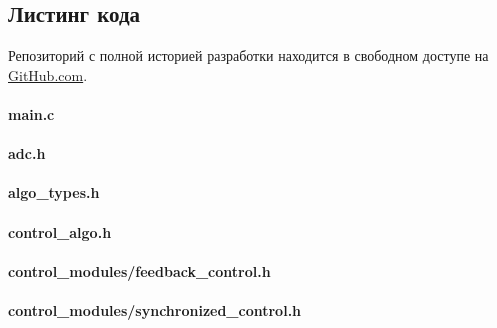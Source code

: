 \clearpage
\subsection{Листинг кода}

Репозиторий с полной историей разработки находится в свободном доступе на
\href{https://github.com/TheGreenBox/sattelite_step_drive}{GitHub.com}.

\paragraph{main.c}
\label{module_main}


\paragraph{adc.h}
\label{module_adc}



\paragraph{algo\_types.h}
\label{module_algo_types}



\paragraph{control\_algo.h}
\label{module_control_algo}



\paragraph{control\_modules/feedback\_control.h}
\label{module_control_modules_feedback_control}



\paragraph{control\_modules/synchronized\_control.h}
\label{module_control_modules_synchronized_control}



